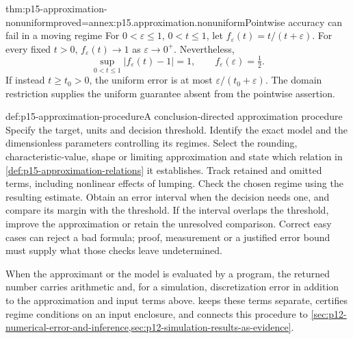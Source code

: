 \begin{hbtheorem}{thm:p15-approximation-nonuniform}{proved=annex:p15.approximation.nonuniform}{Pointwise accuracy can fail in a moving regime}
For \(0<\varepsilon\leq1\), \(0<t\leq1\), let
\(f_\varepsilon(t)=t/(t+\varepsilon)\).
For every fixed \(t>0\), \(f_\varepsilon(t)\to1\) as
\(\varepsilon\to0^+\). Nevertheless,
\[
 \sup_{0<t\leq1}|f_\varepsilon(t)-1|=1,
 \qquad f_\varepsilon(\varepsilon)=\tfrac12.
\]
If instead \(t\geq t_0>0\), the uniform error is at most
\(\varepsilon/(t_0+\varepsilon)\). The domain restriction supplies the
uniform guarantee absent from the pointwise assertion.
\end{hbtheorem}

\begin{hbmethod}{def:p15-approximation-procedure}{A conclusion-directed approximation procedure}
Specify the target, units and decision threshold. Identify the exact model
and the dimensionless parameters controlling its regimes. Select the
rounding, characteristic-value, shape or limiting approximation and state
which relation in \cref{def:p15-approximation-relations} it establishes.
Track retained and omitted terms, including nonlinear effects of lumping.
Check the chosen regime using the resulting estimate. Obtain an error
interval when the decision needs one, and compare its margin with the
threshold. If the interval overlaps the threshold, improve the approximation
or retain the unresolved comparison. Correct easy cases can reject a bad
formula; proof, measurement or a justified error bound must supply what
those checks leave undetermined.
\end{hbmethod}

When the approximant or the model is evaluated by a program, the returned
number carries arithmetic and, for a simulation, discretization error in
addition to the approximation and input terms above.
 keeps these terms separate, certifies regime
conditions on an input enclosure, and connects this procedure to
\cref{sec:p12-numerical-error-and-inference,sec:p12-simulation-results-as-evidence}.
